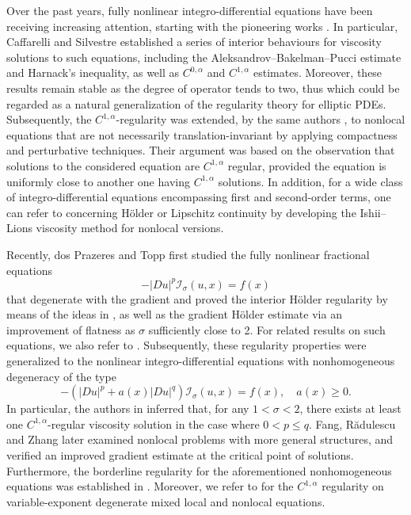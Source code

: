 \documentclass[11pt,reqno]{amsart}
\numberwithin{equation}{section}
\begin{document}
Over the past years, fully nonlinear integro-differential equations have been receiving increasing attention, starting with the pioneering works \cite{CS09,CS11}. In particular, Caffarelli and Silvestre \cite{CS09} established a series of interior behaviours for viscosity solutions to such equations, including the Aleksandrov--Bakelman--Pucci estimate and Harnack's inequality, as well as $C^{0,\alpha}$ and $C^{1,\alpha}$ estimates. Moreover, these results remain stable as the degree of operator tends to two, thus which could be regarded as a natural generalization of the regularity theory for elliptic PDEs. Subsequently, the $C^{1,\alpha}$-regularity was extended, by the same authors \cite{CS11}, to nonlocal equations that are not necessarily translation-invariant by applying compactness and perturbative techniques. Their argument was based on the observation that solutions to the considered equation are $C^{1,\alpha}$ regular, provided the equation is uniformly close to another one having $C^{1,\alpha}$ solutions. In addition, for a wide class of integro-differential equations encompassing first and second-order terms, one can refer to \cite{BCI11, BCCI12} concerning H\"{o}lder or Lipschitz continuity by developing the Ishii--Lions viscosity method for nonlocal versions.

Recently, dos Prazeres and Topp \cite{PT21} first studied the fully nonlinear fractional equations
$$
-|Du|^p\mathcal{I}_\sigma (u, x)=f(x)
$$
that degenerate with the gradient and proved the interior H\"{o}lder regularity by means of the ideas in \cite{BCI11, BCCI12}, as well as the gradient H\"{o}lder estimate via an improvement of flatness as $\sigma$ sufficiently close to 2. For related results on such equations, we also refer to \cite{BKLT15, APT23}. Subsequently, these regularity properties were generalized to the nonlinear integro-differential equations with nonhomogeneous degeneracy of the type
$$
-(|Du|^p+a(x)|Du|^q)\mathcal{I}_\sigma (u, x)=f(x),   \quad a(x)\ge0.
$$
In particular, the authors in \cite{APS24} inferred that, for any $1<\sigma<2$, there exists at least one $C^{1, \alpha}$-regular viscosity solution in the case where $0<p\le q$. Fang, R\u{a}dulescu and Zhang \cite{FRZ25} later examined nonlocal problems with more general structures, and verified an improved gradient estimate at the critical point of solutions. Furthermore, the borderline regularity for the aforementioned nonhomogeneous equations was established in \cite{WJ25}. Moreover, we refer to \cite{OT23} for the $C^{1, \alpha}$ regularity on variable-exponent degenerate mixed local and nonlocal equations.
\end{document}
